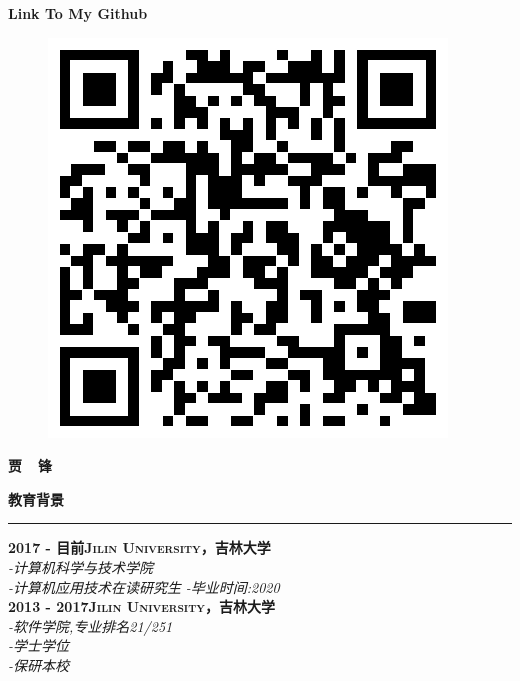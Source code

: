 \documentclass[a4paper,12pt,final]{memoir}
\newcommand{\myThemeColor}{RoyalBlue}
\newcommand{\SmallSep}{\vspace{0.9em}}
\newcommand{\CVSection}[1]
	{\Large\textbf{#1}\par
	\vspace{0.2cm}\normalsize\normalfont}
\newcommand{\CVItem}[1]
	{\textbf{\color{\myThemeColor} #1}}
\begin{document}
\begin{CJK*}{UTF8}{gbsn}
\begin{flushright}
	\SmallSep
	\SmallSep
	\SmallSep
	
	\CVItem{\large Link To My Github}
	\begin{figure}[h]
		\centering
		\includegraphics[width=0.8\columnwidth]{Github.png}
	\end{figure}
	

\end{flushright}\normalsize
\framebreak


\Huge\bfseries {\color{\myThemeColor} 贾~~锋}\\
\normalsize\normalfont

\CVSection{教育背景}
\hrule
\SmallSep
\CVItem{2017 - 目前\hfill\textsc{Jilin University，吉林大学}}\\
\textit{-计算机科学与技术学院}\\
\textit{-计算机应用技术在读研究生}
\textit{-毕业时间:2020}
\\
\CVItem{2013 - 2017\hfill\textsc{Jilin University，吉林大学}}\\
\textit{-软件学院,专业排名21/251}\\
\textit{-学士学位}\\
\textit{-保研本校}\\


\end{CJK*}
\end{document}
